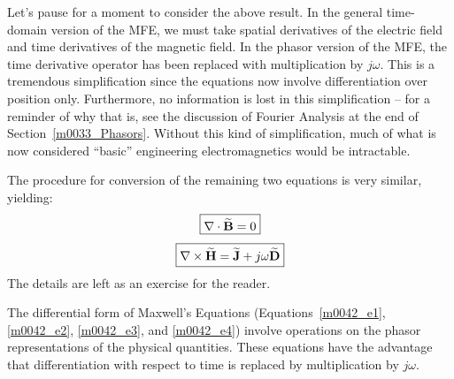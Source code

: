 Let's pause for a moment to consider the above result.  
In the general time-domain version of the MFE, we must take spatial derivatives of the electric field and time derivatives of the magnetic field.
In the phasor version of the MFE, the time derivative operator has been replaced with multiplication by $j\omega$.
This is a tremendous simplification since the equations now involve differentiation over position only.
Furthermore, no information is lost in this simplification -- for a reminder of why that is, see the discussion of Fourier Analysis at the end of Section~\ref{m0033_Phasors}.
Without this kind of simplification, much of what is now considered ``basic'' engineering electromagnetics would be intractable.

The procedure for conversion of the remaining two equations is very similar, yielding:
%
\begin{equation}   
\boxed{
\nabla \cdot \widetilde{\bf B} = 0
}
\label{m0042_e3}
\end{equation}
%
\begin{equation} 
\boxed{  
\nabla \times \widetilde{\bf H} = \widetilde{\bf J} + j\omega\widetilde{\bf D}
}
\label{m0042_e4}
\end{equation}
%
The details are left as an exercise for the reader.

\begin{mdframed}[backgroundcolor=yellow!20,nobreak=true] 
The differential form of Maxwell's Equations (Equations~\ref{m0042_e1}, \ref{m0042_e2}, \ref{m0042_e3}, and \ref{m0042_e4}) involve operations on the phasor representations of the physical quantities.
These equations have the advantage that differentiation with respect to time is replaced by multiplication by $j\omega$.
\end{mdframed}

